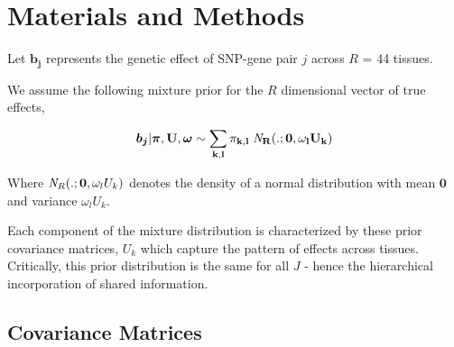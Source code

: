 
\section*{Materials and Methods}

Let  $\bm{b_{j}}$ represents the genetic effect of SNP-gene pair $j$ across $R$ = 44 tissues.

We assume the following mixture prior for the $R$ dimensional vector of true effects,  

 \begin{equation}
  \bm{b_{j}} | \bm{\pi},\bf{U}, \bm{\omega} \sim \sum_{k,l} \pi_{k,l} \;{\it N}_R(.; \bm{0}, \omega_l U_{k})
\end{equation}

Where ${\it N}_R(.; \bm{0}, \omega_l U_{k})$ denotes the density of a normal distribution with mean $\bm{0}$ and variance $\omega_l U_{k}$.


Each component of the mixture distribution is characterized by these prior covariance matrices, $U_{k}$ which capture the pattern of effects across tissues. Critically, this prior distribution is the same for all $J$ - hence the hierarchical incorporation of shared information.

\subsection{Covariance Matrices}\label{sssec:num1}

